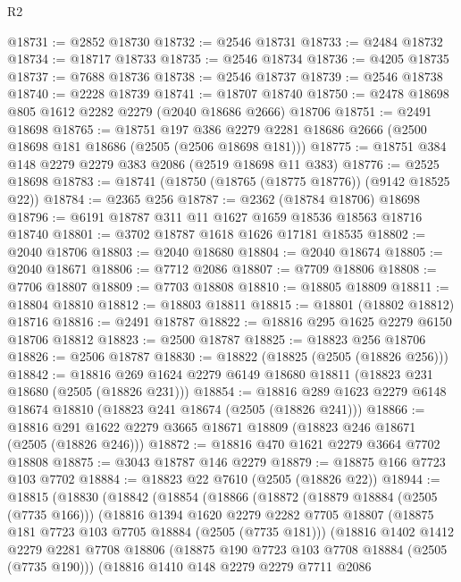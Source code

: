 \begin{lexlean}{R2}
\begin{coremodule}
@18731 := @2852 @18730
@18732 := @2546 @18731
@18733 := @2484 @18732
@18734 := @18717 @18733
@18735 := @2546 @18734
@18736 := @4205 @18735
@18737 := @7688 @18736
@18738 := @2546 @18737
@18739 := @2546 @18738
@18740 := @2228 @18739
@18741 := @18707 @18740
@18750 := @2478 @18698 @805 @1612 @2282 @2279 (@2040 @18686 @2666) @18706
@18751 := @2491 @18698
@18765 := @18751
    @197
    @386
    @2279
    @2281
    @18686
    @2666
    (@2500 @18698 @181 @18686 (@2505 (@2506 @18698 @181)))
@18775 := @18751 @384 @148 @2279 @2279 @383 @2086 (@2519 @18698 @11 @383)
@18776 := @2525 @18698
@18783 := @18741 (@18750 (@18765 (@18775 @18776)) (@9142 @18525 @22))
@18784 := @2365 @256
@18787 := @2362 (@18784 @18706) @18698
@18796 := @6191 @18787 @311 @11 @1627 @1659 @18536 @18563 @18716 @18740
@18801 := @3702 @18787 @1618 @1626 @17181 @18535
@18802 := @2040 @18706
@18803 := @2040 @18680
@18804 := @2040 @18674
@18805 := @2040 @18671
@18806 := @7712 @2086
@18807 := @7709 @18806
@18808 := @7706 @18807
@18809 := @7703 @18808
@18810 := @18805 @18809
@18811 := @18804 @18810
@18812 := @18803 @18811
@18815 := @18801 (@18802 @18812) @18716
@18816 := @2491 @18787
@18822 := @18816 @295 @1625 @2279 @6150 @18706 @18812
@18823 := @2500 @18787
@18825 := @18823 @256 @18706
@18826 := @2506 @18787
@18830 := @18822 (@18825 (@2505 (@18826 @256)))
@18842 := @18816 @269 @1624 @2279 @6149 @18680 @18811 (@18823 @231 @18680 (@2505 (@18826 @231)))
@18854 := @18816 @289 @1623 @2279 @6148 @18674 @18810 (@18823 @241 @18674 (@2505 (@18826 @241)))
@18866 := @18816 @291 @1622 @2279 @3665 @18671 @18809 (@18823 @246 @18671 (@2505 (@18826 @246)))
@18872 := @18816 @470 @1621 @2279 @3664 @7702 @18808
@18875 := @3043 @18787 @146 @2279
@18879 := @18875 @166 @7723 @103 @7702
@18884 := @18823 @22 @7610 (@2505 (@18826 @22))
@18944 := @18815
    (@18830
      (@18842
        (@18854
          (@18866
            (@18872
              (@18879 @18884 (@2505 (@7735 @166)))
              (@18816
                @1394
                @1620
                @2279
                @2282
                @7705
                @18807
                (@18875 @181 @7723 @103 @7705 @18884 (@2505 (@7735 @181)))
                (@18816
                  @1402
                  @1412
                  @2279
                  @2281
                  @7708
                  @18806
                  (@18875 @190 @7723 @103 @7708 @18884 (@2505 (@7735 @190)))
                  (@18816
                    @1410
                    @148
                    @2279
                    @2279
                    @7711
                    @2086

\end{coremodule}
\end{lexlean}
